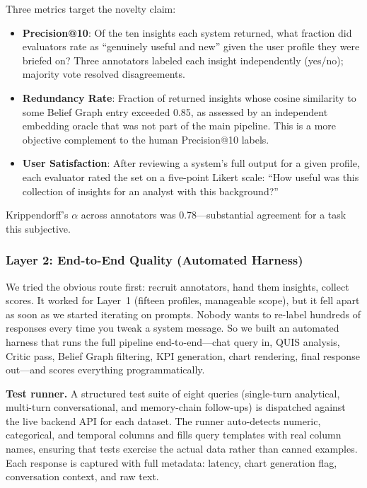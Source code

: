 \documentclass[conference]{IEEEtran}
\begin{document}
Three metrics target the novelty claim:

\begin{itemize}
  \item \textbf{Precision@10}: Of the ten insights each system
  returned, what fraction did evaluators rate as ``genuinely useful
  and new'' given the user profile they were briefed on? Three
  annotators labeled each insight independently (yes/no); majority
  vote resolved disagreements.

  \item \textbf{Redundancy Rate}: Fraction of returned insights
  whose cosine similarity to some Belief Graph entry exceeded 0.85,
  as assessed by an independent embedding oracle that was not part
  of the main pipeline. This is a more objective complement to the
  human Precision@10 labels.

  \item \textbf{User Satisfaction}: After reviewing a system's
  full output for a given profile, each evaluator rated the set
  on a five-point Likert scale: ``How useful was this collection
  of insights for an analyst with this background?''
\end{itemize}

Krippendorff's $\alpha$ across annotators was 0.78---substantial
agreement for a task this subjective.

\subsubsection{Layer 2: End-to-End Quality (Automated Harness)}
\label{sec:autoeval}

We tried the obvious route first: recruit annotators, hand them
insights, collect scores. It worked for Layer~1 (fifteen profiles,
manageable scope), but it fell apart as soon as we started iterating
on prompts. Nobody wants to re-label hundreds of responses every
time you tweak a system message. So we built an automated harness
that runs the full pipeline end-to-end---chat query in, QUIS
analysis, Critic pass, Belief Graph filtering, KPI generation,
chart rendering, final response out---and scores everything
programmatically.

\textbf{Test runner.} A structured test suite of eight queries
(single-turn analytical, multi-turn conversational, and memory-chain
follow-ups) is dispatched against the live backend API for each
dataset. The runner auto-detects numeric, categorical, and temporal
columns and fills query templates with real column names, ensuring
that tests exercise the actual data rather than canned examples.
Each response is captured with full metadata: latency, chart
generation flag, conversation context, and raw text.
\end{document}
